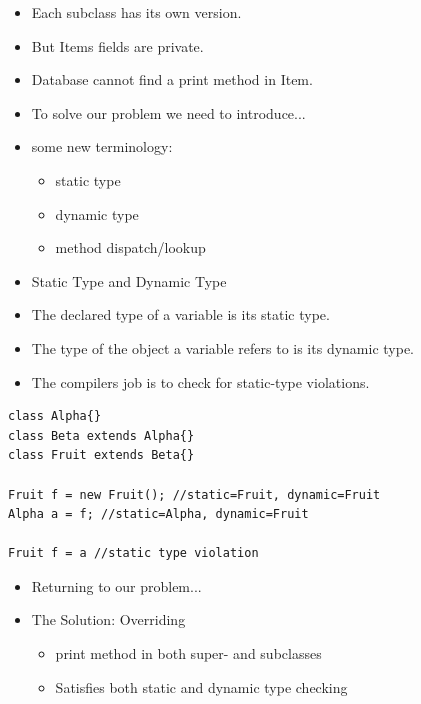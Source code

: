 \documentclass{beamer}
\begin{document}
\begin{frame}
\begin{itemize}
\item Each subclass has its own version.
\item But Items fields are private.
\item Database cannot find a print method in Item.
\end{itemize}
\end{frame}

\begin{frame}
\begin{itemize}
\item To solve our problem we need to introduce...
\item some new terminology:
\begin{itemize}
\item static type
\item dynamic type
\item method dispatch/lookup
\end{itemize}
\end{itemize}
\end{frame}

\begin{frame}[fragile]
\begin{itemize}
\item Static Type and Dynamic Type
\item The declared type of a variable is its static type.
\item The type of the object a variable refers to is its dynamic type.
\item The compilers job is to check for static-type violations.
\end{itemize} 
\end{frame}

\begin{frame}[fragile]
\begin{block}{}
\begin{lstlisting}
class Alpha{}
class Beta extends Alpha{}
class Fruit extends Beta{}

Fruit f = new Fruit(); //static=Fruit, dynamic=Fruit
Alpha a = f; //static=Alpha, dynamic=Fruit

Fruit f = a //static type violation

\end{lstlisting}
\end{block}
\end{frame}

\begin{frame}
\begin{itemize}
\item Returning to our problem...
\item The Solution: Overriding
\begin{itemize}
\item print method in both super- and subclasses
\item Satisfies both static and dynamic type checking
\end{itemize}
\end{itemize}
\end{frame}
\end{document}
